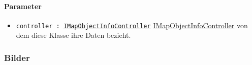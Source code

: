 \paragraph*{Parameter}
\begin{itemize}
    \item \texttt{controller : \hyperref[App_Map_ViewModel_IMapObjectInfoController]{IMapObjectInfoController}} \hyperref[App_Map_ViewModel_IMapObjectInfoController]{IMapObjectInfoController} von dem diese Klasse ihre Daten bezieht.
\end{itemize}

\subsubsection*{Bilder}\label{App_Map_View_MapObjectInfoDisplay_Bilder}
\begin{minipage}{\linewidth}
    \centering
    \begin{minipage}{.49\textwidth}
        \captionsetup[figure]{labelformat=empty}
        \captionsetup[figure]{labelformat=default}
    \end{minipage}
    \begin{minipage}{.49\textwidth}
        \captionsetup[figure]{labelformat=empty}
        \captionsetup[figure]{labelformat=default}
    \end{minipage}
\end{minipage}